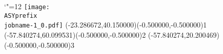 \setlength{\unitlength}{1pt}
\makeatletter%
\let\ASYencoding\f@encoding%
\let\ASYfamily\f@family%
\let\ASYseries\f@series%
\let\ASYshape\f@shape%
\makeatother%
{\catcode`"=12%
\texttt{[image: \\ASYprefix\\jobname-1\_0.pdf]}%
}%
\color{ASYcolor}
\fontsize{12.000000}{14.400000}\selectfont
\usefont{\ASYencoding}{\ASYfamily}{\ASYseries}{\ASYshape}%
\ASYalign(-23.286672,40.150000)(-0.500000,-0.500000){1}%
\color{ASYcolor}
\fontsize{12.000000}{14.400000}\selectfont
\ASYalign(-57.840274,60.099531)(-0.500000,-0.500000){2}%
\color{ASYcolor}
\fontsize{12.000000}{14.400000}\selectfont
\ASYalign(-57.840274,20.200469)(-0.500000,-0.500000){3}%
